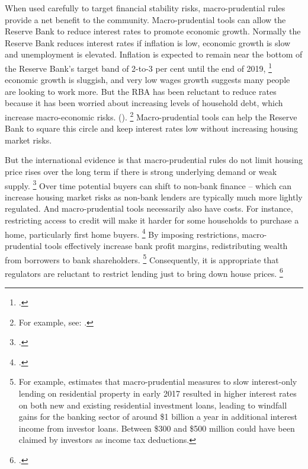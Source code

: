 When used carefully to target financial stability risks, macro-prudential rules provide a net benefit to the community.
Macro-prudential tools can allow the Reserve Bank to reduce interest rates to promote economic growth.
Normally the Reserve Bank reduces interest rates if inflation is low, economic growth is slow and unemployment is elevated.
Inflation is expected to remain near the bottom of the Reserve Bank's target band of 2-to-3 per cent until the end of 2019,%
    \footcite[][63]{RBAStatementonMonetaryPolicyAug17}
economic growth is sluggish, and very low wages growth suggests many people are looking to work more.
But the RBA has been reluctant to reduce rates because it has been worried about increasing levels of household debt, which increase macro-economic risks.
().%
	\footnote{For example, see: \textcites{RBAFinancialStabilityApril2017}{RBA-statement-nov-2017}.}
Macro-prudential tools can help the Reserve Bank to square this circle and keep interest rates low without increasing housing market risks.

But the international evidence is that macro-prudential rules do not limit housing price rises over the long term if there is strong underlying demand or weak supply.%
	\footcite{Lowe2017Householddebt}
Over time potential buyers can shift to non-bank finance -- which can increase housing market risks as non-bank lenders are typically much more lightly regulated.
And macro-prudential tools necessarily also have costs.
For instance, restricting access to credit will make it harder for some households to purchase a home, particularly first home buyers.%
	\footcite[][6]{Tripe2014MacroPrudential}
By imposing restrictions, macro-prudential tools effectively increase bank profit margins, redistributing wealth from borrowers to bank shareholders.%
    \footnote{For example, \textcite[][173]{ProductivityCommission2018CompetitionFinSector} estimates that macro-prudential measures to slow interest-only lending on residential property in early 2017 resulted in higher interest rates on both new and existing residential investment loans, leading to windfall gains for the banking sector of around \$1 billion a year in additional interest income from investor loans. Between \$300 and \$500 million could have been claimed by investors as income tax deductions.}
Consequently, it is appropriate that regulators are reluctant to restrict lending just to bring down house prices.%
	\footcite{Byres-2017-Prudential-perspectives-property-market}

